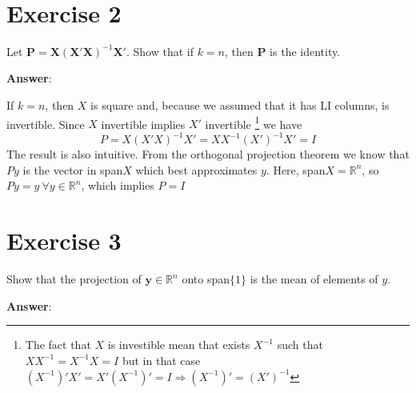 \documentclass[11pt,twoside,fleqn,reqno,a4paper]{amsart}
\numberwithin{equation}{section}
\newcommand{\matr}[1]{\mathbf{#1}} %
\begin{document}
\vfill \
\section*{Exercise 2}
\setcounter{section}{3}
\begin{em}
Let $ \matr{P} = \matr{X} ( \matr{X}' \matr{X})^{-1} \matr{X}' $. Show that if $k=n$, then $ \matr{P} $
is the identity.
\end{em}

\textbf{Answer}:

If $ k=n $, then $X$ is square and, because we assumed that it has LI columns, is invertible. 
Since $X$ invertible implies $ X'$ invertible%
\footnote{The fact that $X$ is investible mean that exists $X^{-1}$ such that $XX^{-1} = X^{-1} X = I $
but in that case $( X^{-1} )' X' = X' ( X^{-1} )' =I \Rightarrow ( X^{-1} )' = ( X' )^{-1}$}
%
we have
\[ 
    P = X( X'X )^{-1} X' = XX^{-1} ( X' )^{-1}X' = I
\]
The result is also intuitive. From the orthogonal projection theorem we know that $ Py $ is the vector in span$X$ which best
approximates $y$. Here, span$X=\mathbb{R}^n$, so $Py = y \ \forall y\in\mathbb{R}^n $, which implies $P=I$
\section*{Exercise 3}
\setcounter{section}{3}
\begin{em}
Show that the projection of $ \matr{y} \in \mathbb{R}^n $ onto span$\{1\}$ is the mean of elements of $y$.
\end{em}

\textbf{Answer}:
\end{document}
